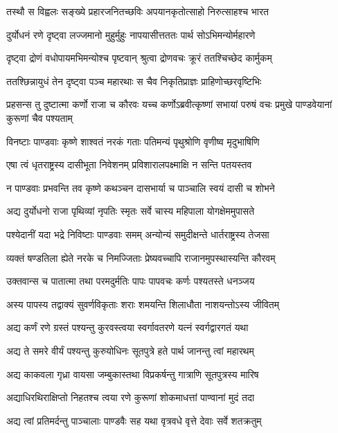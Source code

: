 \twolineshloka
{तस्थौ स विह्वलः सङ्ख्ये प्रहारजनितच्छविः}
{अपयानकृतोत्साहो निरुत्साहश्च भारत}


\twolineshloka
{दुर्योधनं रणे दृष्ट्वा लज्जमानो मुहुर्मुहुः}
{नापयासीत्तततः पार्थ सोऽभिमन्योर्महारणे}


\twolineshloka
{दृष्ट्वा द्रोणं वधोपायमभिमन्योश्च पृष्टवान्}
{श्रुत्वा द्रोणवचः क्रूरं ततश्चिच्छेद कार्मुकम्}


\twolineshloka
{ततश्छिन्नायुधं तेन दृष्ट्वा पञ्च महारथाः}
{स चैव निकृतिप्राज्ञः प्राहिणोच्छरवृष्टिभिः}


\threelineshloka
{प्रहसन्स तु दुष्टात्मा कर्णो राजा च कौरवः}
{यच्च कर्णोऽब्रवीत्कृष्णां सभायां परुषं वचः}
{प्रमुखे पाण्डवेयानां कुरूणां चैव पश्यताम्}


\twolineshloka
{विनष्टाः पाण्डवाः कृष्णे शाश्वतं नरकं गताः}
{पतिमन्यं पृथुश्रोणि वृणीष्व मृदुभाषिणि}


\twolineshloka
{एषा त्वं धृतराष्ट्रस्य दासीभूता निवेशनम्}
{प्रविशारालपक्ष्माक्षि न सन्ति पतयस्तव}


\twolineshloka
{न पाण्डवाः प्रभवन्ति तव कृष्णे कथञ्चन}
{दासभार्या च पाञ्चालि स्वयं दासी च शोभने}


\twolineshloka
{अद्य दुर्योधनो राजा पृथिव्यां नृपतिः स्मृतः}
{सर्वे चास्य महिपाला योगक्षेममुपासते}


\twolineshloka
{पश्येदानीं यदा भद्रे निविष्टाः पाण्डवाः समम्}
{अन्योन्यं समुदीक्षन्ते धार्तराष्ट्रस्य तेजसा}


\twolineshloka
{व्यक्तं षण्डतिला ह्येते नरके च निमज्जिताः}
{प्रेष्यवच्चापि राजानमुपस्थास्यन्ति कौरवम्}


\twolineshloka
{उक्तवान्स च पातात्मा तथा परमदुर्मतिः}
{पापः पापवचः कर्णः पश्यतस्ते धनञ्जय}


\twolineshloka
{अस्य पापस्य तद्वाक्यं सुवर्णविकृताः शराः}
{शमयन्ति शिलाधौता नाशयन्तोऽस्य जीवितम्}


\twolineshloka
{अद्य कर्णं रणे ग्रस्तं पश्यन्तु कुरवस्त्वया}
{स्वर्गावतरणे यत्नं स्वर्गद्वारगतं यथा}


\twolineshloka
{अद्य ते समरे वीर्यं पश्यन्तु कुरुयोधिनः}
{सूतपुत्रे हते पार्थ जानन्तु त्वां महारथम्}


\twolineshloka
{अद्य काकवला गृध्रा वायसा जम्बुकास्तथा}
{विप्रकर्षन्तु गात्राणि सूतपुत्रस्य मारिष}


\twolineshloka
{अद्याधिरथिराक्षिप्तो निहतश्च त्वया रणे}
{कुरूणां शोकमाधत्तां पाण्वानां मुदं तदा}


\twolineshloka
{अद्य त्वां प्रतिमर्दन्तु पाञ्चालाः पाण्डवैः सह}
{यथा वृत्रवधे वृत्ते देवाः सर्वे शतक्रतुम्}


